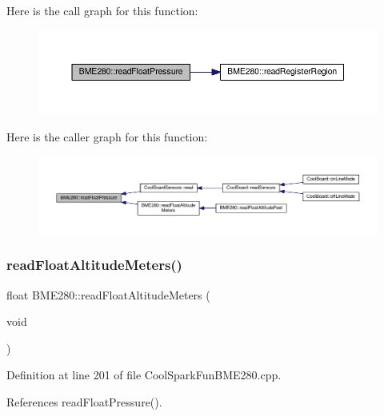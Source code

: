 Here is the call graph for this function\+:
\nopagebreak
\begin{figure}[H]
\begin{center}
\leavevmode
\includegraphics[width=350pt]{df/dcf/class_b_m_e280_ada6e799917afb4f228e6253bc56ffe75_cgraph}
\end{center}
\end{figure}
Here is the caller graph for this function\+:\nopagebreak
\begin{figure}[H]
\begin{center}
\leavevmode
\includegraphics[width=350pt]{df/dcf/class_b_m_e280_ada6e799917afb4f228e6253bc56ffe75_icgraph}
\end{center}
\end{figure}
\mbox{\label{class_b_m_e280_af67b56ba50760ee1d116acc6c5010221}} 
\subsubsection{\texorpdfstring{read\+Float\+Altitude\+Meters()}{readFloatAltitudeMeters()}}
{\footnotesize\ttfamily float B\+M\+E280\+::read\+Float\+Altitude\+Meters (\begin{DoxyParamCaption}\item[{void}]{ }\end{DoxyParamCaption})}



Definition at line 201 of file Cool\+Spark\+Fun\+B\+M\+E280.\+cpp.



References read\+Float\+Pressure().



